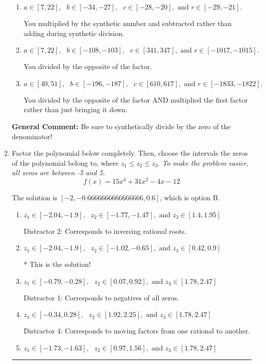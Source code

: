 \documentclass{extbook}[14pt]
\newcommand{\litem}[1]{\item #1

\rule{\textwidth}{0.4pt}}
\begin{document}
\begin{enumerate}
{\begin{enumerate}[label=\Alph*.]
* This is the solution!
\item \( a \in [7, 22], \text{   } b \in [-34, -27], \text{   } c \in [-28, -20], \text{   and   } r \in [-29, -21]. \)

 You multiplied by the synthetic number and subtracted rather than adding during synthetic division.
\item \( a \in [7, 22], \text{   } b \in [-108, -103], \text{   } c \in [341, 347], \text{   and   } r \in [-1017, -1015]. \)

 You divided by the opposite of the factor.
\item \( a \in [40, 51], \text{   } b \in [-196, -187], \text{   } c \in [610, 617], \text{   and   } r \in [-1833, -1822]. \)

 You divided by the opposite of the factor AND multiplied the first factor rather than just bringing it down.
\end{enumerate}

\textbf{General Comment:} Be sure to synthetically divide by the zero of the denominator!
}
\litem{
Factor the polynomial below completely. Then, choose the intervals the zeros of the polynomial belong to, where $z_1 \leq z_2 \leq z_3$. \textit{To make the problem easier, all zeros are between -5 and 5.}
\[ f(x) = 15x^{3} +31 x^{2} -4 x -12 \]

The solution is \( [-2, -0.6666666666666666, 0.6] \), which is option B.\begin{enumerate}[label=\Alph*.]
\item \( z_1 \in [-2.04, -1.9], \text{   }  z_2 \in [-1.77, -1.47], \text{   and   } z_3 \in [1.4, 1.95] \)

 Distractor 2: Corresponds to inversing rational roots.
\item \( z_1 \in [-2.04, -1.9], \text{   }  z_2 \in [-1.02, -0.65], \text{   and   } z_3 \in [0.42, 0.9] \)

* This is the solution!
\item \( z_1 \in [-0.79, -0.28], \text{   }  z_2 \in [0.07, 0.92], \text{   and   } z_3 \in [1.78, 2.47] \)

 Distractor 1: Corresponds to negatives of all zeros.
\item \( z_1 \in [-0.34, 0.28], \text{   }  z_2 \in [1.92, 2.25], \text{   and   } z_3 \in [1.78, 2.47] \)

 Distractor 4: Corresponds to moving factors from one rational to another.
\item \( z_1 \in [-1.73, -1.63], \text{   }  z_2 \in [0.97, 1.56], \text{   and   } z_3 \in [1.78, 2.47] \)


\end{enumerate}}
\end{enumerate}
\end{document}

